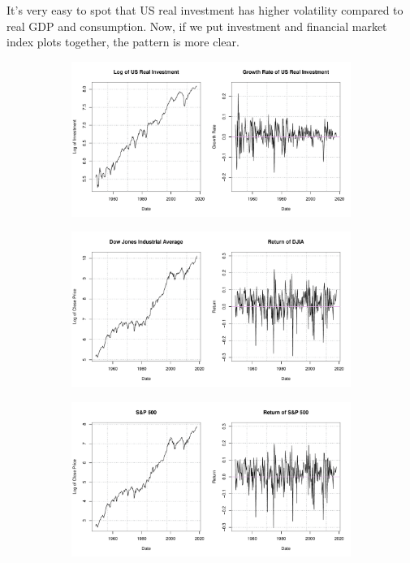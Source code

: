 \documentclass[12pt]{article}
\theoremstyle{definition}
\numberwithin{equation}{section}
\numberwithin{figure}{section}
\numberwithin{table}{section}
\begin{document}
It's very easy to spot that US real investment has higher volatility compared to real GDP and consumption. Now, if we put investment and financial market index plots together, the pattern is more clear.
\begin{figure}[H]
  \centering
  \begin{subfigure}[b]{0.85\textwidth}
    \centering
    \includegraphics[width=\textwidth]{../Figures/usInv}
  \end{subfigure}
  \begin{subfigure}[b]{0.85\textwidth}
    \centering
    \includegraphics[width=\textwidth]{../Figures/usDJIA}
  \end{subfigure}
  \begin{subfigure}[b]{0.85\textwidth}
    \centering
    \includegraphics[width=\textwidth]{../Figures/usSPX}
  \end{subfigure}
\end{figure}
\end{document}
